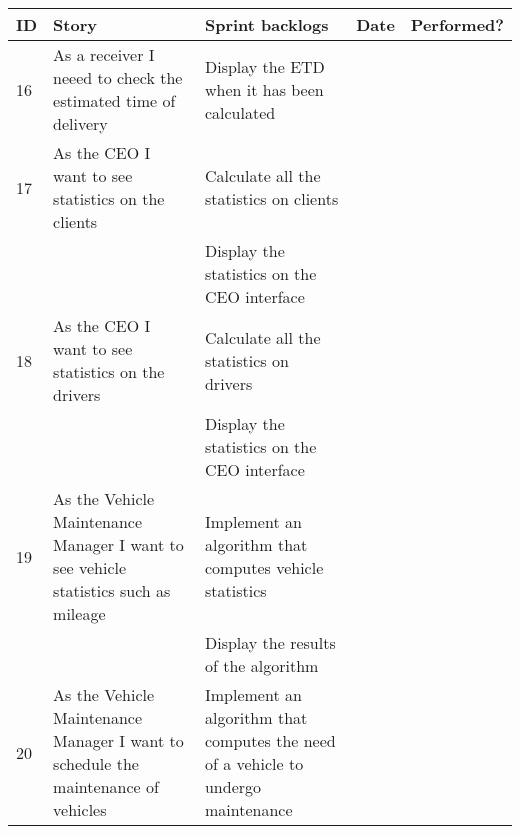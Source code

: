 \documentclass[paper=a4, fontsize=11pt]{scrartcl} %
\numberwithin{equation}{section} %
\numberwithin{figure}{section} %
\numberwithin{table}{section} %
\begin{document}
\begin{table}[]
\centering
\label{my-label}
\begin{tabular}{|p{1cm}|p{4cm}|p{4cm}|p{2cm}|p{2cm}|}
\hline
\textbf{ID} & \textbf{Story}                                                                                         & \textbf{Sprint backlogs}                                                          & \textbf{Date} & \textbf{Performed?} \\ \hline
16          & As a receiver I neeed to check the estimated time of delivery                                          & Display the ETD when it has been calculated                                       &               &                     \\ \hline
17          & As the CEO I want to see statistics on the clients                                                     & Calculate all the statistics on clients                                           &               &                     \\ \hline
            &                                                                                                        & Display the statistics on the CEO interface                                       &               &                     \\ \hline
18          & As the CEO I want to see statistics on the drivers                                                     & Calculate all the statistics on drivers                                           &               &                     \\ \hline
            &                                                                                                        & Display the statistics on the CEO interface                                       &               &                     \\ \hline
19          & As the Vehicle Maintenance Manager I want to see vehicle statistics such as mileage                    & Implement an algorithm that computes vehicle statistics                           &               &                     \\ \hline
            &                                                                                                        & Display the results of the algorithm                                              &               &                     \\ \hline
20          & As the Vehicle Maintenance Manager I want to schedule the maintenance of vehicles                      & Implement an algorithm that computes the need of a vehicle to undergo maintenance &               &                     \\ \hline

\end{tabular}
\end{table}
\end{document}
